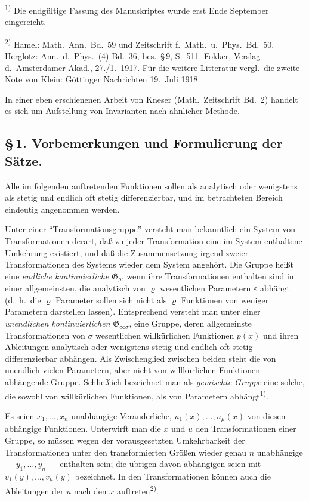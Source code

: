 \documentclass[12pt,a4paper]{article}
\begin{document}
\smallskip
\noindent\textsuperscript{1)} Die endg\"ultige Fassung des Manuskriptes wurde erst Ende September eingereicht.

\smallskip
\noindent\textsuperscript{2)} Hamel: Math.\ Ann.\ Bd.\ 59 und Zeitschrift f.\ Math.\ u.\ Phys.\ Bd.\ 50. Herglotz: Ann.\ d.\ Phys.\ (4) Bd.\ 36, bes.\ \S\,9, S.\ 511. Fokker, Verslag d.\ Amsterdamer Akad., 27./1.\ 1917. F\"ur die weitere Litteratur vergl.\ die zweite Note von Klein: G\"ottinger Nachrichten 19.\ Juli 1918.

In einer eben erschienenen Arbeit von Kneser (Math.\ Zeitschrift Bd.\ 2) handelt es sich um Aufstellung von Invarianten nach \"ahnlicher Methode.

\subsection*{\S\,1. Vorbemerkungen und Formulierung der S\"atze.}

Alle im folgenden auftretenden Funktionen sollen als analytisch oder wenigstens als stetig und endlich oft stetig differenzierbar, und im betrachteten Bereich eindeutig angenommen werden.

Unter einer ``Transformationsgruppe'' versteht man bekanntlich ein System von Transformationen derart, da\ss{} zu jeder Transformation eine im System enthaltene Umkehrung existiert, und da\ss{} die Zusammensetzung irgend zweier Transformationen des Systems wieder dem System angeh\"ort. Die Gruppe hei\ss{}t eine \emph{endliche kontinuierliche} $\mathfrak{G}_{\varrho}$, wenn ihre Transformationen enthalten sind in einer allgemeinsten, die analytisch von $\varrho$ wesentlichen Parametern $\varepsilon$ abh\"angt (d.\ h.\ die $\varrho$ Parameter sollen sich nicht als $\varrho$ Funktionen von weniger Parametern darstellen lassen). Entsprechend versteht man unter einer \emph{unendlichen kontinuierlichen} $\mathfrak{G}_{\infty\sigma}$, eine Gruppe, deren allgemeinste Transformationen von $\sigma$ wesentlichen willk\"urlichen Funktionen $p(x)$ und ihren Ableitungen analytisch oder wenigstens stetig und endlich oft stetig differenzierbar abh\"angen. Als Zwischenglied zwischen beiden steht die von unendlich vielen Parametern, aber nicht von willk\"urlichen Funktionen abh\"angende Gruppe. Schlie\ss{}lich bezeichnet man als \emph{gemischte Gruppe} eine solche, die sowohl von willk\"urlichen Funktionen, als von Parametern abh\"angt\textsuperscript{1)}.

Es seien $x_{1},\ldots,x_{n}$ unabh\"angige Ver\"anderliche, $u_{1}(x),\ldots,u_{\mu}(x)$ von diesen abh\"angige Funktionen. Unterwirft man die $x$ und $u$ den Transformationen einer Gruppe, so m\"ussen wegen der vorausgesetzten Umkehrbarkeit der Transformationen unter den transformierten Gr\"o\ss{}en wieder genau $n$ unabh\"angige --- $y_{1},\ldots,y_{n}$ --- enthalten sein; die \"ubrigen davon abh\"angigen seien mit $v_{1}(y),\ldots,v_{\mu}(y)$ bezeichnet. In den Transformationen k\"onnen auch die Ableitungen der $u$ nach den $x$ auftreten\textsuperscript{2)}.
\end{document}
